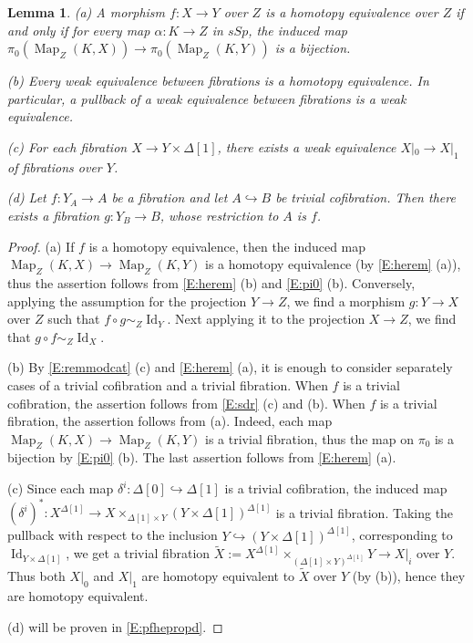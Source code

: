 \documentclass[12pt]{amsart}
\theoremstyle{plain}
\newtheorem{Lem}[Thm]{Lemma}
\theoremstyle{definition}
\numberwithin{equation}{section}
\newcommand{\hra}{\hookrightarrow}
\newcommand{\wt}{\widetilde}
\newcommand{\dt}{\delta}
\newcommand{\Dt}{\Delta}
\newcommand{\al}{\alpha}
\newcommand{\re}[1]{\ref{E:#1}}
\newcommand{\Map}{\operatorname{Map}}
\newcommand{\Id}{\operatorname{Id}}
\begin{document}
\begin{Lem} \label{L:heprop}
(a) A morphism $f:X\to Y$ over $Z$ is a homotopy equivalence over
$Z$ if and only if for every map $\al:K\to Z$ in $sSp$, the induced map
$\pi_0(\Map_Z(K,X))\to \pi_0(\Map_Z(K,Y))$ is a bijection.

(b) Every weak equivalence between fibrations is a homotopy
equivalence. In particular, a pullback of a weak equivalence
between fibrations is a weak equivalence.

(c) For each fibration $X\to Y\times\Dt[1]$, there exists a weak
equivalence $X|_0\to X|_1$ of fibrations over $Y$.

(d) Let $f:Y_A\to A$ be a fibration and let $A\hra B$ be trivial
cofibration. Then there exists a fibration $g:Y_B\to B$, whose
restriction to $A$ is $f$.
\end{Lem}

\begin{proof}
(a) If $f$ is a homotopy equivalence, then the induced map
$\Map_Z(K,X)\to\Map_Z(K,Y)$ is a homotopy equivalence (by
\re{herem} (a)), thus the assertion follows from \re{herem} (b)
and \re{pi0} (b). Conversely, applying the assumption for the
projection $Y\to Z$, we find a morphism $g:Y\to X$ over $Z$ such
that $f\circ g\sim_Z \Id_Y$. Next applying it to the projection
$X\to Z$, we find that  $g\circ f\sim_Z \Id_X$.

(b) By \re{remmodcat} (c) and \re{herem} (a), it is enough to
consider separately cases of a trivial cofibration and a trivial
fibration. When $f$ is a trivial cofibration, the assertion follows
from \re{sdr} (c) and (b). When $f$ is a trivial fibration, the
assertion follows from (a). Indeed, each map $\Map_Z(K,X)\to
\Map_Z(K,Y)$ is a trivial fibration, thus the map on $\pi_0$ is a
bijection by \re{pi0} (b). The last assertion follows from
\re{herem} (a).

(c) Since each map $\dt^i:\Dt[0]\hra\Dt[1]$ is a trivial
cofibration, the induced map $(\dt^i)^*:X^{\Dt[1]}\to X\times_{\Dt[1]\times
Y}(Y\times \Dt[1])^{\Dt[1]}$ is a trivial
fibration. Taking the pullback with respect to the inclusion
$Y\hra(Y\times \Dt[1])^{\Dt[1]}$, corresponding to $\Id_{Y\times
\Dt[1]}$, we get a trivial fibration
$\wt{X}:=X^{\Dt[1]}\times_{(\Dt[1]\times Y)^{\Dt[1]}}Y\to X|_i$
over $Y$. Thus both $X|_0$ and $X|_1$ are homotopy equivalent to
$\wt{X}$ over $Y$ (by (b)), hence they are homotopy equivalent.

(d) will be proven in \re{pfhepropd}.
\end{proof}
\end{document}

